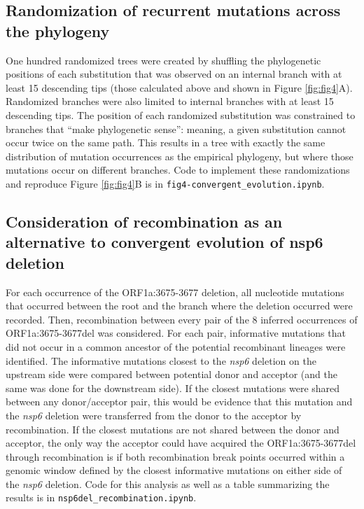 \documentclass[11pt,oneside,letterpaper]{article}
\begin{document}
\subsection*{Randomization of recurrent mutations across the phylogeny}
One hundred randomized trees were created by shuffling the phylogenetic positions of each substitution that was observed on an internal branch with at least 15 descending tips (those calculated above and shown in Figure \ref{fig:fig4}A). Randomized branches were also limited to internal branches with at least 15 descending tips. The position of each randomized substitution was constrained to branches that “make phylogenetic sense”: meaning, a given substitution cannot occur twice on the same path. This results in a tree with exactly the same distribution of mutation occurrences as the empirical phylogeny, but where those mutations occur on different branches. Code to implement these randomizations and reproduce Figure \ref{fig:fig4}B is in \texttt{fig4-convergent\_evolution.ipynb}.

\subsection*{Consideration of recombination as an alternative to convergent evolution of nsp6 deletion}
For each occurrence of the ORF1a:3675-3677 deletion, all nucleotide mutations that occurred between the root and the branch where the deletion occurred were recorded. Then, recombination between every pair of the 8 inferred occurrences of ORF1a:3675-3677del was considered. For each pair, informative mutations that did not occur in a common ancestor of the potential recombinant lineages were identified. The informative mutations closest to the \emph{nsp6} deletion on the upstream side were compared between potential donor and acceptor (and the same was done for the downstream side). If the closest mutations were shared between any donor/acceptor pair, this would be evidence that this mutation and the \emph{nsp6} deletion were transferred from the donor to the acceptor by recombination. If the closest mutations are not shared between the donor and acceptor, the only way the acceptor could have acquired the ORF1a:3675-3677del through recombination is if both recombination break points occurred within a genomic window defined by the closest informative mutations on either side of the \emph{nsp6} deletion. Code for this analysis as well as a table summarizing the results is in \texttt{nsp6del\_recombination.ipynb}.
\end{document}
